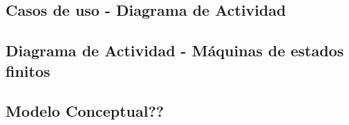 \subsection{Casos de uso - Diagrama de Actividad}

\subsection{Diagrama de Actividad - Máquinas de estados finitos}


\subsection{Modelo Conceptual??}
